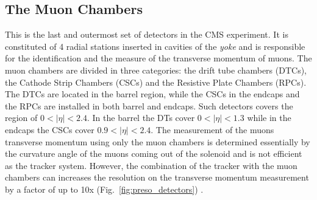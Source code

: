 \subsection{The Muon Chambers}
This is the last and outermost set of detectors in the CMS experiment. It is constituted of 4 radial stations inserted in cavities of the \textit{yoke} and is responsible for the identification and the measure of the transverse momentum of muons. The muon chambers are divided in three categories: the drift tube chambers (DTCs), the Cathode Strip Chambers (CSCs) and the Resistive Plate Chambers (RPCs). The DTCs are located in the barrel region, while the CSCs in the endcaps and the RPCs are installed in both barrel and endcaps. Such detectors covers the region of $0 < |\eta| < 2.4$. In the barrel the DTs cover $0 < |\eta| < 1.3$ while in the endcaps the CSCs cover $0.9 < |\eta| < 2.4$. The measurement of the muons transverse momentum using only the muon chambers is determined essentially by the curvature angle of the muons coming out of the solenoid and is not efficient as the tracker system. However, the combination of the tracker with the muon chambers can increases the resolution on the transverse momentum measurement by a factor of up to 10x (Fig.~\ref{fig:preso_detectors}) \cite{bib:CMS-PTDR-2006,bib:CMS-MSTDR-1997}.


